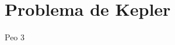 \documentclass[../main.tex]{subfiles}
\begin{document}
\section{Problema de Kepler}
Peo 3
 
\end{document}
